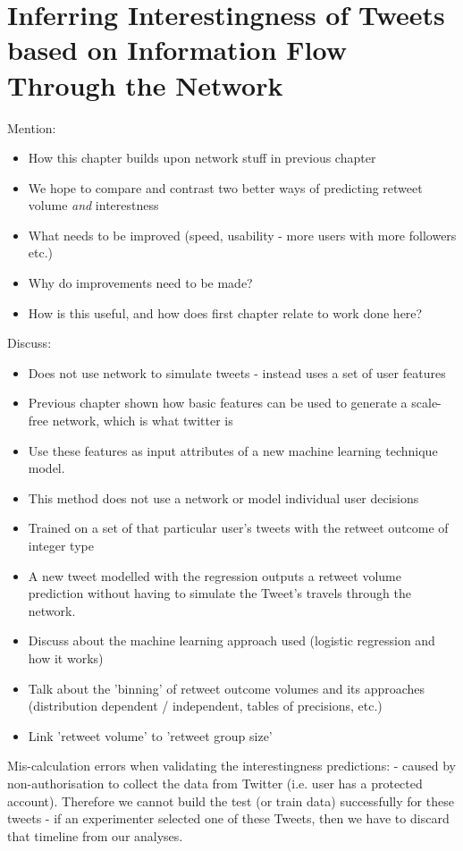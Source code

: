 \chapter{Inferring Interestingness of Tweets based on Information Flow Through the Network}


Mention:
\begin{itemize}
\item How this chapter builds upon network stuff in previous chapter
\item We hope to compare and contrast two better ways of predicting retweet volume \emph{and} interestness
\item What needs to be improved (speed, usability - more users with more followers etc.)
\item Why do improvements need to be made?
\item How is this useful, and how does first chapter relate to work done here?
\end{itemize}

Discuss:
\begin{itemize}
\item Does not use network to simulate tweets - instead uses a set of user features
\item Previous chapter shown how basic features can be used to generate a scale-free network, which is what twitter is
\item Use these features as input attributes of a new machine learning technique model.
\item This method does not use a network or model individual user decisions
\item Trained on a set of that particular user's tweets with the retweet outcome of integer type
\item A new tweet modelled with the regression outputs a retweet volume prediction without having to simulate the Tweet's travels through the network. 
\item Discuss about the machine learning approach used (logistic regression and how it works)
\item Talk about the 'binning' of retweet outcome volumes and its approaches (distribution dependent / independent, tables of precisions, etc.)
\item Link 'retweet volume' to 'retweet group size'
\end{itemize}

Mis-calculation errors when validating the interestingness predictions:
 - caused by non-authorisation to collect the data from Twitter (i.e. user has a protected account). Therefore we cannot build the test (or train data) successfully for these tweets
 - if an experimenter selected one of these Tweets, then we have to discard that timeline from our analyses.
 

